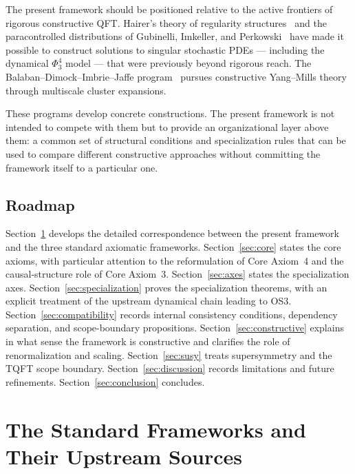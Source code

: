 \documentclass[12pt,a4paper]{article}
\theoremstyle{plain}
\theoremstyle{definition}
\theoremstyle{remark}
\begin{document}
The present framework should be positioned relative to the active
frontiers of rigorous constructive QFT. Hairer's theory of regularity
structures~\cite{Hairer2014} and the paracontrolled distributions of
Gubinelli, Imkeller, and Perkowski~\cite{GIP} have made it possible
to construct solutions to singular stochastic PDEs --- including the
dynamical $\Phi^4_3$ model --- that were previously beyond rigorous
reach. The Balaban--Dimock--Imbrie--Jaffe
program~\cite{Balaban1,Balaban2} pursues constructive Yang--Mills
theory through multiscale cluster expansions.

These programs develop concrete constructions. The present framework
is not intended to compete with them but to provide an organizational
layer above them: a common set of structural conditions and
specialization rules that can be used to compare different
constructive approaches without committing the framework itself to a
particular one.


\subsection{Roadmap}

Section~\ref{sec:existing} develops the detailed correspondence
between the present framework and the three standard axiomatic
frameworks. Section~\ref{sec:core} states the core axioms, with
particular attention to the reformulation of Core Axiom~4 and the
causal-structure role of Core Axiom~3. Section~\ref{sec:axes} states
the specialization axes. Section~\ref{sec:specialization} proves the
specialization theorems, with an explicit treatment of the upstream
dynamical chain leading to OS3. Section~\ref{sec:compatibility}
records internal consistency conditions, dependency separation, and
scope-boundary propositions. Section~\ref{sec:constructive} explains
in what sense the framework is constructive and clarifies the role of
renormalization and scaling. Section~\ref{sec:susy} treats
supersymmetry and the TQFT scope boundary.
Section~\ref{sec:discussion} records limitations and future
refinements. Section~\ref{sec:conclusion} concludes.


\section{The Standard Frameworks and Their Upstream Sources}
\label{sec:existing}
\end{document}
